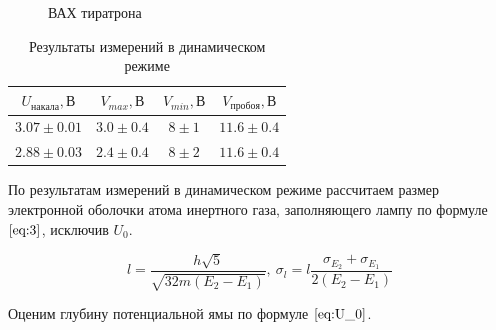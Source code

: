\documentclass[a4paper, 12pt]{article}
\begin{document}
            \begin{figure}[h!]
                    \centering
                    \qquad
                    \caption{ВАХ тиратрона}%
                    \label{fig:example}%
            \end{figure}

            \begin{table}[!ht]
                \centering
                \begin{tabular}{|c|c|c|c|}
                    \hline

                    $U_{накала}, В$ & $V_{max}, В$ & $V_{min}, В$ & $V_{пробоя}, В$\\ \hline
                    $3.07 \pm 0.01$ & $3.0 \pm 0.4$ & $8 \pm 1$ & $11.6 \pm 0.4$\\ \hline
                    $2.88 \pm 0.03$ & $2.4 \pm 0.4$ & $8 \pm 2$ & $11.6 \pm 0.4$\\ \hline

                \end{tabular}
                \caption{Результаты измерений в динамическом режиме}
               \label{}
            \end{table}

            По результатам измерений в динамическом режиме рассчитаем размер электронной оболочки атома инертного газа, заполняющего лампу по формуле $\eqref{eq:3}$, исключив $U_0$.

    \[ l = \frac{h\sqrt{5}}{\sqrt{32m(E_2-E_1)}}, ~\sigma_{l} = l \frac{\sigma_{E_2} + \sigma_{E_1}}{2(E_2 - E_1)}\]

            Оценим глубину потенциальной ямы по формуле $\eqref{eq:U_0}$.
\end{document}
